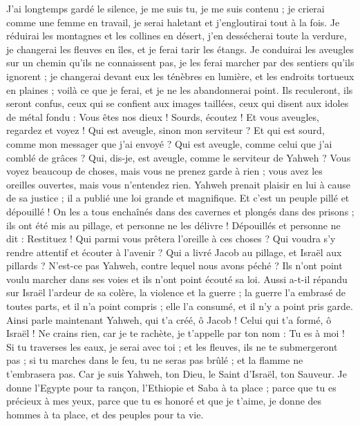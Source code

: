 \begin{multicols}{2}
J'ai longtemps gardé le silence, je me suis tu, je me suis contenu ; je crierai comme une femme en travail, je serai haletant et j'engloutirai tout à la fois.
Je réduirai les montagnes et les collines en désert, j'en dessécherai toute la verdure, je changerai les fleuves en îles, et je ferai tarir les étangs.
Je conduirai les aveugles sur un chemin qu'ils ne connaissent pas, je les ferai marcher par des sentiers qu'ils ignorent ; je changerai devant eux les ténèbres en lumière, et les endroits tortueux en plaines ; voilà ce que je ferai, et je ne les abandonnerai point.
Ils reculeront, ils seront confus, ceux qui se confient aux images taillées, ceux qui disent aux idoles de métal fondu : Vous êtes nos dieux !
Sourds, écoutez ! Et vous aveugles, regardez et voyez !
Qui est aveugle, sinon mon serviteur ? Et qui est sourd, comme mon messager que j'ai envoyé ? Qui est aveugle, comme celui que j'ai comblé de grâces ? Qui, dis-je, est aveugle, comme le serviteur de Yahweh ?
Vous voyez beaucoup de choses, mais vous ne prenez garde à rien ; vous avez les oreilles ouvertes, mais vous n'entendez rien.
Yahweh prenait plaisir en lui à cause de sa justice ; il a publié une loi grande et magnifique.
Et c'est un peuple pillé et dépouillé ! On les a tous enchaînés dans des cavernes et plongés dans des prisons ; ils ont été mis au pillage, et personne ne les délivre ! Dépouillés et personne ne dit : Restituez !
Qui parmi vous prêtera l'oreille à ces choses ? Qui voudra s'y rendre attentif et écouter à l'avenir ?
Qui a livré Jacob au pillage, et Israël aux pillards ? N'est-ce pas Yahweh, contre lequel nous avons péché ? Ils n'ont point voulu marcher dans ses voies et ils n'ont point écouté sa loi.
Aussi a-t-il répandu sur Israël l'ardeur de sa colère, la violence et la guerre ; la guerre l'a embrasé de toutes parts, et il n'a point compris ; elle l'a consumé, et il n'y a point pris garde.
\VerseOne{}Ainsi parle maintenant Yahweh, qui t'a créé, ô Jacob ! Celui qui t'a formé, ô Israël ! Ne crains rien, car je te rachète, je t'appelle par ton nom : Tu es à moi !
Si tu traverses les eaux, je serai avec toi ; et les fleuves, ils ne te submergeront pas ; si tu marches dans le feu, tu ne seras pas brûlé ; et la flamme ne t'embrasera pas.
Car je suis Yahweh, ton Dieu, le Saint d'Israël, ton Sauveur. Je donne l'Egypte pour ta rançon, l'Ethiopie et Saba à ta place ;
parce que tu es précieux à mes yeux, parce que tu es honoré et que je t'aime, je donne des hommes à ta place, et des peuples pour ta vie.

\end{multicols}
